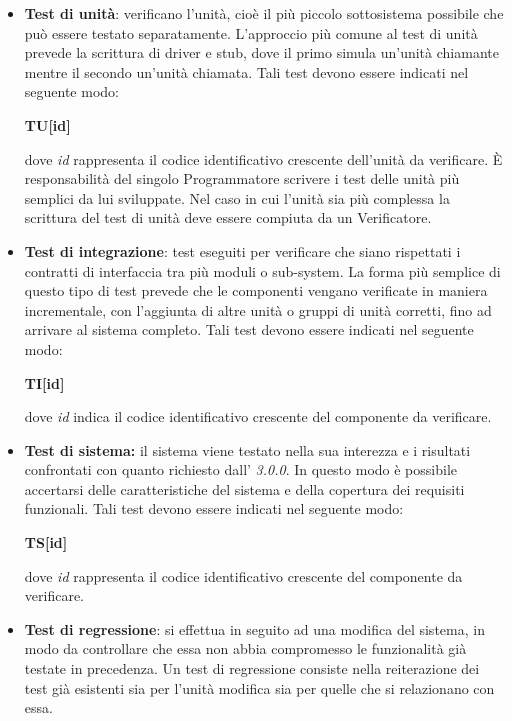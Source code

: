         \begin{itemize}
          \item \textbf{Test di unità}: verificano l'unità, cioè il più piccolo sottosistema possibile che può essere testato separatamente. L'approccio più comune al test di unità prevede la scrittura di driver e stub, dove il primo simula un'unità chiamante mentre il secondo un'unità chiamata. Tali test devono essere indicati nel seguente modo: 
          \begin{center}
          	\textbf{TU[id]}
          \end{center}
      	  dove \textit{id} rappresenta il codice identificativo crescente dell'unità da verificare. È responsabilità del singolo Programmatore scrivere i test delle unità più semplici da lui sviluppate. Nel caso in cui l'unità sia più complessa la scrittura del test di unità deve essere compiuta da un Verificatore. 
        
          \item \textbf{Test di integrazione}: test eseguiti per verificare che siano rispettati i contratti di interfaccia tra più moduli o sub-system. La forma più semplice di questo tipo di test prevede che le componenti vengano verificate in maniera incrementale, con l'aggiunta di altre unità o gruppi di unità corretti, fino ad arrivare al sistema completo. Tali test devono essere indicati nel seguente modo: 
          \begin{center}
          	\textbf{TI[id]}
          \end{center}
      		dove \textit{id} indica il codice identificativo crescente del componente da verificare. 
         
			\item \textbf{Test di sistema:} il sistema viene testato nella sua interezza e i  risultati confrontati con quanto richiesto dall'\AdR{} \textit{3.0.0}. In questo modo è possibile accertarsi delle caratteristiche del sistema e della copertura dei requisiti funzionali. Tali test devono essere indicati nel seguente modo: 
			\begin{center}
				\textbf{TS[id]}
			\end{center}
			dove \textit{id} rappresenta il codice identificativo crescente del componente da verificare. 
         
          \item \textbf{Test di regressione}: si effettua in seguito ad una modifica del sistema, in modo da controllare che essa non abbia compromesso le funzionalità già testate in precedenza. Un test di regressione consiste nella reiterazione dei test già esistenti sia per l'unità modifica sia per quelle che si relazionano con essa.
        \end{itemize}

